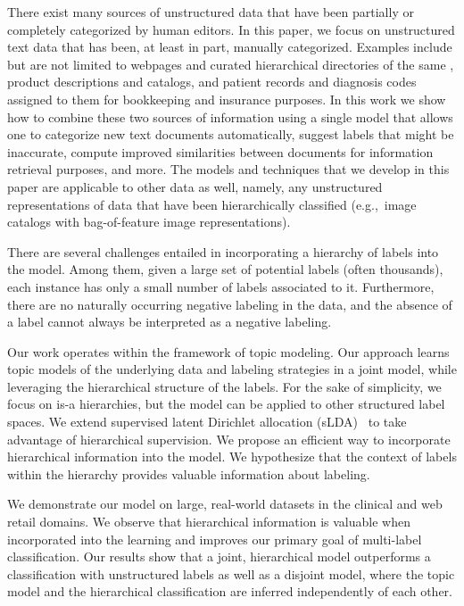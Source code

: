 There exist many sources of unstructured data that have been partially or
completely categorized by human editors.  In this paper, we focus on
unstructured text data that has been, at least in part, manually
categorized.  Examples include but are not limited to webpages and curated
hierarchical directories of the same \citep{DMOZ}, product descriptions and
catalogs, %
and patient records %
and diagnosis codes assigned to them for bookkeeping and insurance purposes.
In this work we show how to combine 
these two sources of information using a single model that allows one to
categorize new text documents automatically, suggest labels that might be
inaccurate, compute improved similarities between documents for information
retrieval purposes, and more. The models and techniques that we develop in
this paper are applicable to other data as well, namely, any unstructured
representations of data that have been hierarchically classified (e.g.,~image
catalogs with bag-of-feature image representations).

There are several challenges entailed in incorporating a hierarchy of labels
into the model. Among them, given a large set of potential labels (often thousands), each
instance has only a small number of labels associated to it. Furthermore, there are no
naturally occurring negative labeling in the data, and the absence of a label
cannot always be interpreted as a negative labeling. 

Our work operates within the framework of topic modeling. Our approach learns
topic models of the underlying data and labeling strategies in a joint model,
while leveraging the hierarchical structure of the labels. For the sake of
simplicity, we focus on is-a hierarchies, but the model can be
applied to other structured label spaces. We extend supervised latent Dirichlet
allocation (sLDA)~\cite{BleiMcAuliffe2008} to take advantage of hierarchical
supervision. We propose an efficient way to incorporate hierarchical
information into the model. We hypothesize that the context of labels within
the hierarchy provides valuable information about labeling. 

We demonstrate our model on large, real-world datasets in the clinical and web
retail domains. We observe that hierarchical information is valuable when
incorporated into the learning and improves our primary goal of multi-label
classification. Our results show that a joint, hierarchical model outperforms a
classification with unstructured labels as well as a disjoint model, where the
topic model and the hierarchical classification are inferred
independently of each other. 

